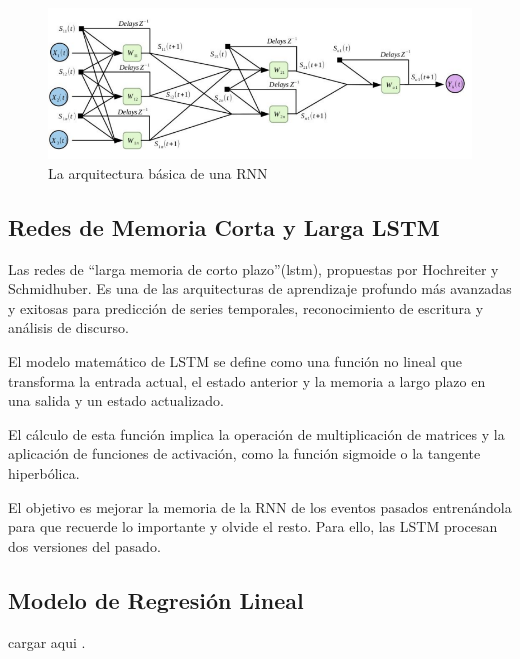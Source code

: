 \begin{figure}[H]
  \begin{center}
    \includegraphics[scale=0.70]{./redes_recurrentes.png}
    \caption{La arquitectura básica de una RNN}
    \label{fig:red_recurreente}
  \end{center}
\end{figure}

 
\subsection{Redes de Memoria Corta y Larga  LSTM}

Las redes de “larga memoria de corto plazo”(\gls{lstm}), propuestas por Hochreiter y Schmidhuber. Es una de las arquitecturas de aprendizaje profundo más avanzadas y exitosas para predicción de series temporales, reconocimiento de escritura y análisis de discurso\cite{fernandez2021estimacion}.

El modelo matemático de LSTM se define como una función no lineal que transforma la entrada actual, el estado anterior y la memoria a largo plazo en una salida y un estado actualizado.

El cálculo de esta función implica la  operación  de  multiplicación  de  matrices  y  la  aplicación  de  funciones  de  activación,  como la función sigmoide o la tangente hiperbólica\cite{tomas2023prediccion}.

El objetivo es mejorar la memoria de la RNN de los eventos pasados entrenándola para que recuerde lo importante y olvide el resto. Para ello, las LSTM procesan dos versiones del pasado\cite{arana2021redes}.

\subsection{Modelo de Regresión Lineal}
cargar aqui \cite{sepulveda2023analisis}.\cite{chang2023comparacion}
